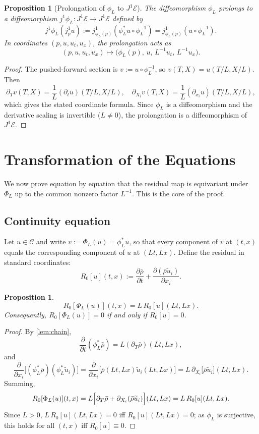 \documentclass[11pt]{article}
\newtheorem{proposition}[theorem]{Proposition}
\theoremstyle{definition}
\theoremstyle{remark}
\newcommand{\E}{\mathcal{E}}
\newcommand{\barrho}{\bar{\rho}}
\newcommand{\tilu}{\widetilde{u}}
\begin{document}
\begin{proposition}[Prolongation of $\phi_L$ to $J^1\E$]
\label{prop:jet-prolong}
The diffeomorphism $\phi_L$ prolongs to a diffeomorphism
$j^1\phi_L:J^1\E\to J^1\E$ defined by
\[
j^1\phi_L(j^1_p u):=j^1_{\phi_L(p)}(\phi_L^*u\circ\phi_L^{-1})
=j^1_{\phi_L(p)}(u\circ\phi_L^{-1}).
\]
In coordinates $(p,u,u_t,u_x)$, the prolongation acts as
\[
(p,u,u_t,u_x)\longmapsto
\bigl(\phi_L(p),\,u,\,L^{-1}u_t,\,L^{-1}u_x\bigr).
\]
\end{proposition}

\begin{proof}
The pushed-forward section is $v:=u\circ\phi_L^{-1}$, so
$v(T,X)=u(T/L,X/L)$.  Then
\[
\partial_T v(T,X)=\frac{1}{L}(\partial_t u)(T/L,X/L),
\quad
\partial_{X_i}v(T,X)=\frac{1}{L}(\partial_{x_i}u)(T/L,X/L),
\]
which gives the stated coordinate formula.  Since $\phi_L$ is a
diffeomorphism and the derivative scaling is invertible ($L\ne0$), the
prolongation is a diffeomorphism of $J^1\E$.
\end{proof}

\section{Transformation of the Equations}
\label{sec:equations}

We now prove equation by equation that the residual map is equivariant under
$\Phi_L$ up to the common nonzero factor $L^{-1}$.  This is the core of the
proof.

\subsection{Continuity equation}

Let $u\in\mathcal C$ and write $v:=\Phi_L(u)=\phi_L^*u$, so that every
component of $v$ at $(t,x)$ equals the corresponding component of $u$ at
$(Lt,Lx)$.  Define the residual in standard coordinates:
\[
R_0[u](t,x):=\frac{\partial\barrho}{\partial t}
+\frac{\partial(\barrho\tilu_i)}{\partial x_i}.
\]

\begin{proposition}
\label{prop:continuity}
\[
R_0[\Phi_L(u)](t,x)=L\,R_0[u](Lt,Lx).
\]
Consequently, $R_0[\Phi_L(u)]=0$ if and only if $R_0[u]=0$.
\end{proposition}

\begin{proof}
By \ref{lem:chain},
\[
\frac{\partial}{\partial t}(\phi_L^*\barrho)
=L(\partial_T\barrho)(Lt,Lx),
\]
and
\[
\frac{\partial}{\partial x_i}\bigl[(\phi_L^*\barrho)(\phi_L^*\tilu_i)\bigr]
=\frac{\partial}{\partial x_i}\bigl[\barrho(Lt,Lx)\tilu_i(Lt,Lx)\bigr]
=L\,\partial_{X_i}\bigl[\barrho\tilu_i\bigr](Lt,Lx).
\]
Summing,
\[
R_0[\Phi_L(u)](t,x)
=L\Bigl[\partial_T\barrho+\partial_{X_i}(\barrho\tilu_i)\Bigr](Lt,Lx)
=L\,R_0[u](Lt,Lx).
\]
Since $L>0$, $L\,R_0[u](Lt,Lx)=0$ iff $R_0[u](Lt,Lx)=0$; as $\phi_L$ is
surjective, this holds for all $(t,x)$ iff $R_0[u]\equiv0$.
\end{proof}
\end{document}
